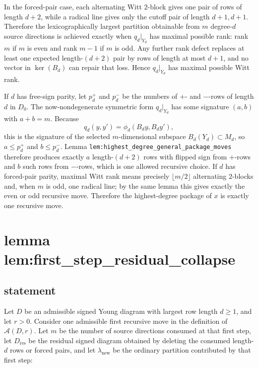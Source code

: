 \documentclass[
]{article}
\begin{document}
In the forced-pair case, each alternating Witt \(2\)-block gives one
pair of rows of length \(d+2\), while a radical line gives only the
cutoff pair of length \(d+1,d+1\). Therefore the lexicographically
largest partition obtainable from \(m\) degree-\(d\) source directions
is achieved exactly when \(q_d|_{Y_d}\) has maximal possible rank: rank
\(m\) if \(m\) is even and rank \(m-1\) if \(m\) is odd. Any further
rank defect replaces at least one expected length-\((d+2)\) pair by rows
of length at most \(d+1\), and no vector in \(\ker(B_d)\) can repair
that loss. Hence \(q_d|_{Y_d}\) has maximal possible Witt rank.

If \(d\) has free-sign parity, let \(p_d^+\) and \(p_d^-\) be the
numbers of \(+\)- and \(-\)-rows of length \(d\) in \(D_0\). The
now-nondegenerate symmetric form \(q_d|_{Y_d}\) has some signature
\((a,b)\) with \(a+b=m\). Because \[
q_d(y,y')=\phi_d(B_dy,B_dy'),
\] this is the signature of the selected \(m\)-dimensional subspace
\(B_d(Y_d)\subset M_d\), so \(a\le p_d^+\) and \(b\le p_d^-\). Lemma
\texttt{lem:highest\_degree\_general\_package\_moves} therefore produces
exactly \(a\) length-\((d+2)\) rows with flipped sign from \(+\)-rows
and \(b\) such rows from \(-\)-rows, which is one allowed recursive
choice. If \(d\) has forced-pair parity, maximal Witt rank means
precisely \(\lfloor m/2\rfloor\) alternating \(2\)-blocks and, when
\(m\) is odd, one radical line; by the same lemma this gives exactly the
even or odd recursive move. Therefore the highest-degree package of
\(x\) is exactly one recursive move.

\section{lemma
lem:first\_step\_residual\_collapse}\label{lemma-lemfirst_step_residual_collapse}

\subsection{statement}\label{statement-24}

Let \(D\) be an admissible signed Young diagram with largest row length
\(d\ge 1\), and let \(r>0\). Consider one admissible first recursive
move in the definition of \(\mathcal A(D,r)\). Let \(m\) be the number
of source directions consumed at that first step, let
\(D_{\mathrm{res}}\) be the residual signed diagram obtained by deleting
the consumed length-\(d\) rows or forced pairs, and let
\(\lambda_{\mathrm{new}}\) be the ordinary partition contributed by that
first step:
\end{document}
